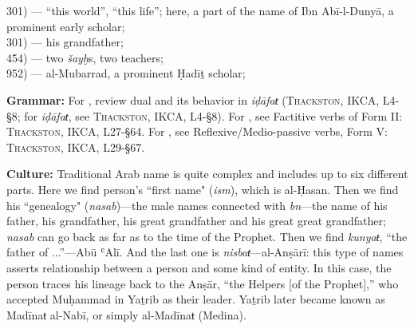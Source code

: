\begin{multicols}{3}
301) \mbox{} ---  ``this world'', ``this life''; here, a part of the name of Ibn Abī-l-Dunyā, a prominent early scholar;\\
301) \mbox{} ---  his grandfather;\\
454) \mbox{} ---  two \textit{šayḫ}s, two teachers;\\
952) \mbox{} ---  al-Mubarrad, a prominent Ḥadīṯ scholar;\\ %
\end{multicols}

\normalsize
\noindent \textbf{Grammar:} For , review dual and its behavior in \textit{iḍāfaŧ} (\textsc{Thackston}, IKCA, L4-§8; for \textit{iḍāfaŧ}, see \textsc{Thackston}, IKCA, L4-§8). For , see Factitive verbs of Form II: \textsc{Thackston}, IKCA, L27-§64. For , see Reflexive/Medio-passive verbs, Form V: \textsc{Thackston}, IKCA, L29-§67.

\normalsize
\noindent \textbf{Culture:} Traditional Arab name is quite complex and includes up to six different parts. Here we find person's ``first name" (\textit{ism}), which is al-Ḥasan. Then we find his ``genealogy" (\textit{nasab})---the male names connected with \textit{bn}---the name of his father, his grandfather, his great grandfather and his great great grandfather; \textit{nasab} can go back as far as to the time of the Prophet. Then we find \textit{kunyaŧ}, ``the father of ...''---Abū ʿAlī. And the last one is \textit{nisbaŧ}---al-Anṣārī: this type of names asserts relationship between a person and some kind of entity. In this case, the person traces his lineage back to the Anṣār, ``the Helpers [of the Prophet],'' who accepted Muḥammad in Yaṯrib as their leader. Yaṯrib later became known as Madīnaŧ al-Nabī, or simply al-Madīnaŧ (Medina).

